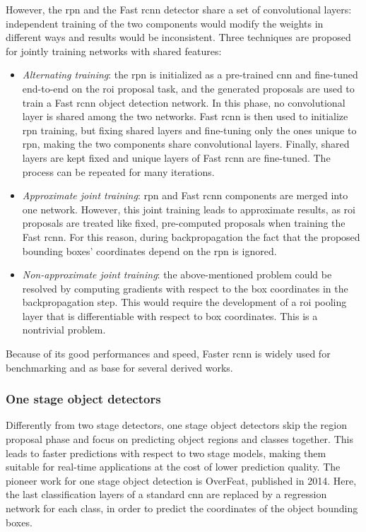 \documentclass[%
    corpo=12pt,
    twoside,
    stile=classica,   
    tipotesi=magistrale,
    evenboxes,
    english,
	numerazioneromana,
]{toptesi}
\begin{document}
\medskip
However, the \gls{rpn} and the Fast \gls{rcnn} detector share a set of convolutional layers: independent training of the two components would modify the weights in different ways and results would be inconsistent. Three techniques are proposed for jointly training networks with shared features:
\begin{itemize}
	\item \textit{Alternating training}: the \gls{rpn} is initialized as a pre-trained \gls{cnn} and fine-tuned end-to-end on the \gls{roi} proposal task, and the generated proposals are used to train a Fast \gls{rcnn} object detection network. In this phase, no convolutional layer is shared among the two networks. Fast \gls{rcnn} is then used to initialize \gls{rpn} training, but fixing shared layers and fine-tuning only the ones unique to \gls{rpn}, making the two components share convolutional layers. Finally, shared layers are kept fixed and unique layers of Fast \gls{rcnn} are fine-tuned. The process can be repeated for many iterations.
	\item \textit{Approximate joint training}: \gls{rpn} and Fast \gls{rcnn} components are merged into one network. However, this joint training leads to approximate results, as \gls{roi} proposals are treated like fixed, pre-computed proposals when training the Fast \gls{rcnn}. For this reason, during backpropagation the fact that the proposed bounding boxes' coordinates depend on the \gls{rpn} is ignored.
	\item \textit{Non-approximate joint training}: the above-mentioned problem could be resolved by computing gradients with respect to the box coordinates in the backpropagation step. This would require the development of a \gls{roi} pooling layer that is differentiable with respect to box coordinates. This is a nontrivial problem.
\end{itemize}

\medskip
Because of its good performances and speed, Faster \gls{rcnn} is widely used for benchmarking and as base for several derived works.

\subsubsection{One stage object detectors}
Differently from two stage detectors, one stage object detectors skip the region proposal phase and focus on predicting object regions and classes together. This leads to faster predictions with respect to two stage models, making them suitable for real-time applications at the cost of lower prediction quality. The pioneer work for one stage object detection is OverFeat\cite{sermanet2014overfeat}, published in 2014. Here, the last classification layers of a standard \gls{cnn} are replaced by a regression network for each class, in order to predict the coordinates of the object bounding boxes.
\end{document}

